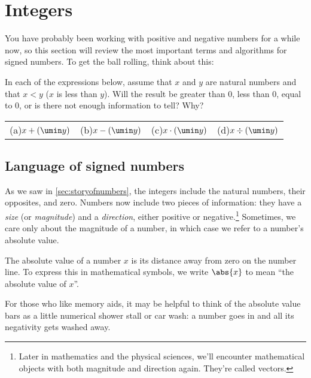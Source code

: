 \section{Integers}
\label{sec:integers}

You have probably been working with positive and negative numbers for a while now, so this section will review the most important terms and algorithms for signed numbers. To get the ball rolling, think about this:

\begin{boxexplore}
In each of the expressions below, assume that $x$ and $y$ are natural numbers and that $x<y$ ($x$ is less than $y$). Will the result be greater than 0, less than 0, equal to 0, or is there not enough information to tell? Why?

\begin{tabularx}{\textwidth}{YYYY}
(a)\quad $x+(\umin y)$
&
(b)\quad $x-(\umin y)$
&
(c)\quad $x \cdot (\umin y)$
&
(d)\quad $x \div (\umin y)$
\end{tabularx}
\end{boxexplore}

\subsection{Language of signed numbers}

As we saw in \cref{sec:storyofnumbers}, the integers include the natural numbers, their opposites, and zero. Numbers now include two pieces of information: they have a \textit{size} (or \textit{magnitude}) and a \textit{direction}, either positive or negative.\footnote{Later in mathematics and the physical sciences, we'll encounter mathematical objects with both magnitude and direction again. They're called vectors.} Sometimes, we care only about the magnitude of a number, in which case we refer to a number's \gls{absolute value}.

\begin{boxdef}
The absolute value of a number $x$ is its distance away from zero on the number line. To express this in mathematical symbols, we write $\abs{x}$ to mean ``the absolute value of $x$''.
\end{boxdef}

For those who like memory aids, it may be helpful to think of the absolute value bars as a little numerical shower stall or car wash: a number goes in and all its negativity gets washed away.

